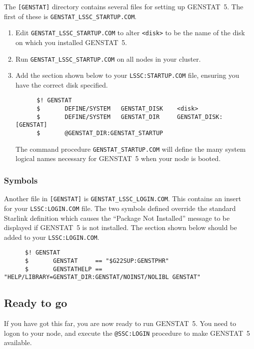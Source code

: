 The {\tt [GENSTAT]} directory contains several files for setting up GENSTAT~5.
The first of these is {\tt GENSTAT\_LSSC\_STARTUP.COM}.
\begin{enumerate}
\item Edit {\tt GENSTAT\_LSSC\_STARTUP.COM} to alter \verb+<disk>+ to
be the name of the disk on which you installed GENSTAT~5.
\item Run {\tt GENSTAT\_LSSC\_STARTUP.COM} on all nodes in your cluster.
\item Add the section shown below to your {\tt LSSC:STARTUP.COM} file, ensuring
you have the correct disk specified.
\begin{small}
\begin{verbatim}
      $! GENSTAT
      $       DEFINE/SYSTEM   GENSTAT_DISK    <disk>
      $       DEFINE/SYSTEM   GENSTAT_DIR     GENSTAT_DISK:[GENSTAT]
      $       @GENSTAT_DIR:GENSTAT_STARTUP
\end{verbatim}
\end{small}
The command procedure {\tt GENSTAT\_STARTUP.COM} will define the many system
logical names necessary for GENSTAT~5 when your node is booted.
\end{enumerate}

\subsubsection{Symbols}

Another file in {\tt [GENSTAT]} is {\tt GENSTAT\_LSSC\_LOGIN.COM}. This
contains an insert for your {\tt LSSC:LOGIN.COM} file. The two symbols defined
override the standard Starlink definition which causes the ``Package Not
Installed'' message to be displayed if GENSTAT~5 is not installed.  The section
shown below should be added to your {\tt LSSC:LOGIN.COM}.
\begin{small}
\begin{verbatim}
      $! GENSTAT
      $       GENSTAT     == "$G22SUP:GENSTPHR"
      $       GENSTATHELP == "HELP/LIBRARY=GENSTAT_DIR:GENSTAT/NOINST/NOLIBL GENSTAT"
\end{verbatim}
\end{small}

\subsection{Ready to go}

If you have got this far, you are now ready to run GENSTAT~5. You need to logon
to your node, and execute the {\tt @SSC:LOGIN} procedure to make GENSTAT~5
available.

